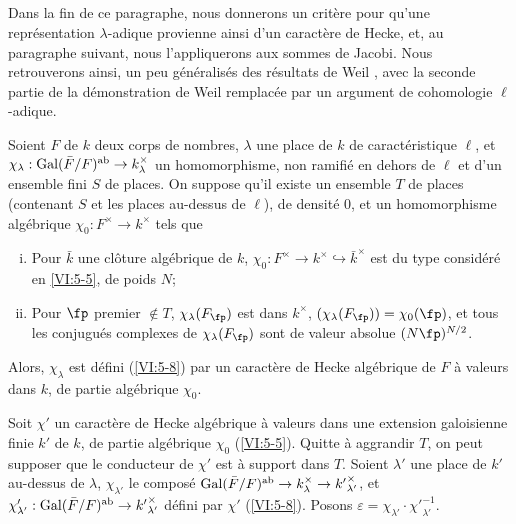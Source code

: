 \subsection{}\label{VI:5-9}

Dans la fin de ce paragraphe, nous donnerons un crit\`ere pour qu'une 
repr\'esentation $\lambda$-adique provienne ainsi d'un caract\`ere de Hecke, 
et, au paragraphe suivant, nous l'appliquerons aux sommes de Jacobi. Nous 
retrouverons ainsi, un peu g\'en\'eralis\'es des r\'esultats de Weil 
\cite{we52,we74-2}, avec la seconde partie de la d\'emonstration de Weil 
remplac\'ee par un argument de cohomologie $\ell$-adique. 





\begin{theorem_}\label{VI:5-10}
Soient $F$ de $k$ deux corps de nombres, $\lambda$ une place de $k$ de 
caract\'eristique $\ell$, et 
$\chi_\lambda:\operatorname{Gal}(\bar F/F)^\textnormal{ab}\to k_\lambda^\times$ un 
homomorphisme, non ramifi\'e en dehors de $\ell$ et d'un ensemble fini $S$ de 
places. On suppose qu'il existe un ensemble $T$ de places (contenant $S$ et les 
places au-dessus de $\ell$), de densit\'e $0$, et un homomorphisme alg\'ebrique 
$\chi_0:F^\times \to k^\times$ tels que 
\begin{enumerate}[(i)]
  \item Pour $\bar k$ une cl\^oture alg\'ebrique de $k$, 
    $\chi_0:F^\times \to k^\times \hookrightarrow \bar k^\times$ est du type 
    consid\'er\'e en \ref{VI:5-5}, de poids $N$; 
  \item Pour $\fp$ premier $\notin T$, $\chi_\lambda(F_\fp)$ est dans 
    $k^\times$, $(\chi_\lambda(F_\fp))=\chi_0(\fp)$, et tous les conjugu\'es 
    complexes de $\chi_\lambda(F_\fp)$ sont de valeur absolue $(N \fp)^{N/2}$. 
\end{enumerate}

Alors, $\chi_\lambda$ est d\'efini (\ref{VI:5-8}) par un caract\`ere de Hecke 
alg\'ebrique de $F$ \`a valeurs dans $k$, de partie alg\'ebrique $\chi_0$. 
\end{theorem_}

Soit $\chi'$ un caract\`ere de Hecke alg\'ebrique \`a valeurs dans une 
extension galoisienne finie $k'$ de $k$, de partie alg\'ebrique $\chi_0$ 
(\ref{VI:5-5}). Quitte \`a aggrandir $T$, on peut supposer que le conducteur de 
$\chi'$ est \`a support dans $T$. Soient $\lambda'$ une place de $k'$ au-dessus 
de $\lambda$, $\chi_{\lambda'}$ le compos\'e 
$\operatorname{Gal}(\bar F/F)^\text{ab}\to k_\lambda^\times \to {k'}_{\lambda'}^\times$, et 
$\chi_{\lambda'}':\operatorname{Gal}(\bar F/F)^\text{ab}\to {k'}_{\lambda'}^\times$ d\'efini 
par $\chi'$ (\ref{VI:5-8}). Posons 
$\varepsilon = \chi_{\lambda'} \cdot {\chi'}_{\lambda'}^{-1}$. 

